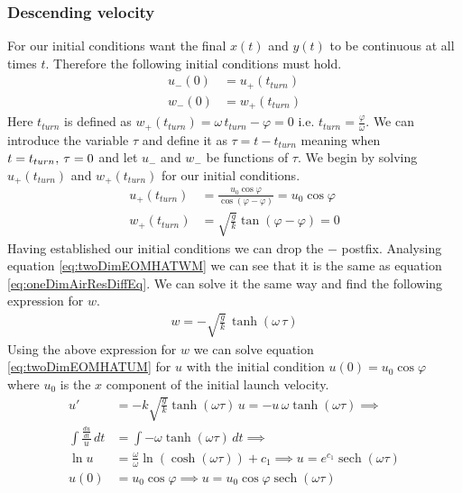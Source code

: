 \documentclass[%
aip,
jmp,
amsmath,amssymb,
reprint,%
]{revtex4-1}
\DeclareMathOperator{\sech}{sech}
\newcommand{\comma}{\hspace{0.1mm},\hspace{0.7mm}}
\begin{document}
	\subsubsection{Descending velocity}\label{seq:twoDimDesVel}
	For our initial conditions want the final $x(t)$ and $y(t)$ to be continuous at all times $t$. Therefore the following initial conditions must hold.
	\begin{align}\nonumber
		u_{-}(0) &= u_{+}(t_{turn})\\\nonumber
		w_{-}(0) &= w_{+}(t_{turn})
	\end{align}
	Here $t_{turn}$ is defined as $w_+(t_{turn}) = \omega\,t_{turn}-\varphi = 0$ i.e. $t_{turn} = \frac{\varphi}{\omega}$. We can introduce the variable $\tau$ and define it as $\tau = t-t_{turn}$ meaning when $t = t_{turn} \comma \tau = 0$ and let $u_{-}$ and $w_{-}$ be functions of $\tau$. We begin by solving $u_+(t_{turn})$ and $w_+(t_{turn})$ for our initial conditions.
	\begin{align}\nonumber
		u_+(t_{turn}) &= \frac{u_0\cos\varphi}{\cos(\varphi-\varphi)} = u_0\cos\varphi\\\nonumber
		w_+(t_{turn}) &= \sqrt{\frac{g}{k}}\tan(\varphi-\varphi) = 0
	\end{align}
	Having established our initial conditions we can drop the $-$ postfix. Analysing equation \eqref{eq:twoDimEOMHATWM} we can see that it is the same as equation \eqref{eq:oneDimAirResDiffEq}. We can solve it the same way and find the following expression for $w$.
	\begin{align}\label{eq:twoDimHATMWFIN}
		w =-\sqrt{\frac{g}{k}}\,\tanh(\omega\,\tau)
	\end{align}
	Using the above expression for $w$ we can solve equation \eqref{eq:twoDimEOMHATUM} for $u$ with the initial condition $u(0) = u_0\cos\varphi$ where $u_0$ is the $x$ component of the initial launch velocity.
	\begin{align}\nonumber
		u' &= -k\sqrt{\frac{g}{k}}\tanh(\omega \tau)\,u = -u\,\omega\tanh(\omega\tau) \implies\\\nonumber
		\int \frac{\frac{du}{dt}}{u}\,dt &= \int -\omega\tanh(\omega\tau)\,dt \implies\\\nonumber
		\ln u &= \frac{\omega}{\omega}\ln(\cosh(\omega\tau)) + c_1 \implies u = e^{c_1}\sech(\omega\tau)\\\label{eq:twoDimHATMUFIN}
		u(0) &= u_0\cos\varphi \implies u = u_0\cos\varphi\sech(\omega\tau)
	\end{align}
\end{document}
